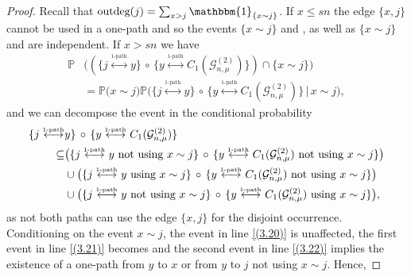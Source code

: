 \documentclass[12pt,a4paper]{article}
\numberwithin{equation}{section}
\begin{document}
\begin{proof}
Recall that $\text{outdeg}(j)=\sum_{x>j}\mathbbm{1}_{\{x\sim j\}}$. If 
$x \le sn $ the edge $\{x,j\}$ cannot be used in a one-path and so the events $\{x\sim j\}$ and , as well as $\{x\sim j\}$ and   are independent. 
If $x>sn$ we have 
\begin{align*}
    \mathbb P & \big( (\{j\overset{_{1\text{-path}}}{\longleftrightarrow}y\}  \,\circ \, \{y\overset{_{1\text{-path}}}{\longleftrightarrow}C_1(\mathcal G^{(2)}_{n,\mu})\}) \cap \{ x \sim j\}  \big)
    \\ & = \mathbb P \big(x \sim j \big) \mathbb P \big( \{j\overset{_{1\text{-path}}}{\longleftrightarrow}y \} \,\circ \, \{y\overset{_{1\text{-path}}}{\longleftrightarrow}C_1(\mathcal G^{(2)}_{n,\mu}) \} \,\big|\,x \sim j \big),
\end{align*}  
and we can decompose the event in the conditional probability
\begin{align}
     \{j  \overset{_{1\text{-path}}}{\longleftrightarrow} & y \} \,\circ \, \{y\overset{_{1\text{-path}}}{\longleftrightarrow}C_1(\mathcal G^{(2)}_{n,\mu}) \} \notag
   \\  \subseteq & \big( \{j\overset{_{1\text{-path}}}{\longleftrightarrow}y \text{ not using } x\sim j \} \,\circ \, \{y\overset{_{1\text{-path}}}{\longleftrightarrow}C_1(\mathcal G^{(2)}_{n,\mu})\text{ not using } x\sim j \} \big) \label{(3.20)}
   \\ & \cup \big( \{j\overset{_{1\text{-path}}}{\longleftrightarrow}y \text{ using } x\sim j \} \,\circ \, \{y\overset{_{1\text{-path}}}{\longleftrightarrow}C_1(\mathcal G^{(2)}_{n,\mu})\text{ not using } x\sim j \} \big) \label{(3.21)}
    \\ & \cup \big( \{j\overset{_{1\text{-path}}}{\longleftrightarrow}y \text{ not using } x\sim j \} \,\circ \, \{y\overset{_{1\text{-path}}}{\longleftrightarrow}C_1(\mathcal G^{(2)}_{n,\mu})\text{ using } x\sim j \} \big),\label{(3.22)}
\end{align}
as not both paths can use the edge $\{x, j\}$ for the disjoint occurrence. Conditioning on the event $x\sim j$, the event in line \eqref{(3.20)} is unaffected, the first event in line \eqref{(3.21)} becomes
 and the second event in line \eqref{(3.22)}  
implies the existence of a one-path from $y$ to $x$ or from  $y$ to $j$ not using $x\sim j$. Hence, 

\end{proof}
\end{document}
